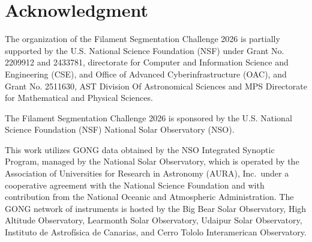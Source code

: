 \documentclass[sigconf,nonacm]{acmart}
\begin{document}
\section{Acknowledgment}
The organization of the Filament Segmentation Challenge 2026 is
partially supported by the U.S. National Science Foundation (NSF)
under Grant No. 2209912 and 2433781, directorate for Computer and
Information Science and Engineering (CSE), and Office of Advanced
Cyberinfrastructure (OAC), and Grant No. 2511630, AST Division
Of Astronomical Sciences and MPS Directorate for Mathematical
and Physical Sciences.

The Filament Segmentation Challenge 2026 is sponsored by the
U.S. National Science Foundation (NSF) National Solar Observatory
(NSO).

This work utilizes GONG data obtained by the NSO Integrated
Synoptic Program, managed by the National Solar Observatory,
which is operated by the Association of Universities for Research
in Astronomy (AURA), Inc.\ under a cooperative agreement with
the National Science Foundation and with contribution from the
National Oceanic and Atmospheric Administration. The GONG
network of instruments is hosted by the Big Bear Solar Observatory,
High Altitude Observatory, Learmonth Solar Observatory, Udaipur
Solar Observatory, Instituto de Astrof\'isica de Canarias, and Cerro
Tololo Interamerican Observatory.
\end{document}
